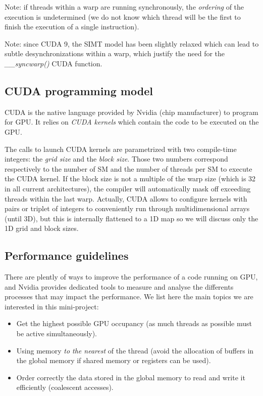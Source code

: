 \documentclass{article}
\begin{document}
Note: if threads within a warp are running synchronously, the \textit{ordering} of the execution is undetermined (we do not know which thread will be the first to finish the execution of a single instruction).

Note: since CUDA 9, the SIMT model has been slightly relaxed which can lead to subtle desynchronizations within a warp, which justify the need for the \textit{\_\_syncwarp()} CUDA function.

\subsection{CUDA programming model}

CUDA is the native language provided by Nvidia (chip manufacturer) to program for GPU. It relies on \textit{CUDA kernels} which contain the code to be executed on the GPU. 

The calls to launch CUDA kernels are parametrized with two compile-time integers: the \textit{grid size} and the \emph{block size}. Those two numbers correspond respectively to the number of SM and the number of threads per SM to execute the CUDA kernel. If the block size is not a multiple of the warp size (which is 32 in all current architectures), the compiler will automatically mask off exceeding threads within the last warp. Actually, CUDA allows to configure kernels with pairs or triplet of integers to conveniently run through multidimensional arrays (until 3D), but this is internally flattened to a 1D map so we will discuss only the 1D grid and block sizes.

\subsection{Performance guidelines}

There are plently of ways to improve the performance of a code running on GPU, and Nvidia provides dedicated tools to measure and analyse the differents processes that may impact the performance. We list here the main topics we are interested in this mini-project:

\begin{itemize}
	\item Get the highest possible GPU occupancy (as much threads as possible must be active simultaneously).
	\item Using memory \textit{to the nearest} of the thread (avoid the allocation of buffers in the global memory if shared memory\cite{cudasharedmemory} or registers can be used).
	\item Order correctly the data stored in the global memory to read and write it efficiently (coalescent accesses).
\end{itemize}
\end{document}
